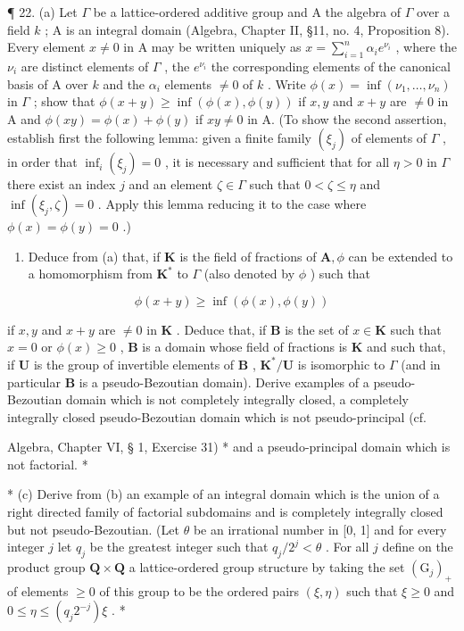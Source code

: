 ¶ 22. (a) Let \(\Gamma\) be a lattice-ordered additive group and A the algebra of \(\Gamma\) over a field \(k\) ; A is an integral domain (Algebra, Chapter II, §11, no. 4, Proposition 8). Every element \(x \neq 0\) in A may be written uniquely as \(x = \sum_{i=1}^{n} \alpha_i e^{\nu_i}\) , where the \(\nu_i\) are distinct elements of \(\Gamma\) , the \(e^{\nu_i}\) the corresponding elements of the canonical basis of A over \(k\) and the \(\alpha_i\) elements \(\neq 0\) of \(k\) . Write \(\phi(x) = \inf(\nu_1, \ldots, \nu_n)\) in \(\Gamma\) ; show that \(\phi(x + y) \geqslant \inf(\phi(x), \phi(y))\) if \(x, y\) and \(x + y\) are \(\neq 0\) in A and \(\phi(xy) = \phi(x) + \phi(y)\) if \(xy \neq 0\) in A. (To show the second assertion, establish first the following lemma: given a finite family \((\xi_j)\) of elements of \(\Gamma\) , in order that \(\inf_{i} (\xi_j) = 0\) , it is necessary and sufficient that for all \(\eta > 0\) in \(\Gamma\) there exist an index \(j\) and an element \(\zeta \in \Gamma\) such that \(0 < \zeta \leqslant \eta\) and \(\inf(\xi_j, \zeta) = 0\) . Apply this lemma reducing it to the case where \(\phi(x) = \phi(y) = 0\) .)

\begin{enumerate}
\def\labelenumi{(\alph{enumi})}
\setcounter{enumi}{1}
\tightlist
\item
  Deduce from (a) that, if \(\mathbf{K}\) is the field of fractions of \(\mathbf{A},\phi\) can be extended to a homomorphism from \(\mathbf{K}^*\) to \(\Gamma\) (also denoted by \(\phi\) ) such that
\end{enumerate}

\[
\phi (x + y) \geqslant \inf (\phi (x), \phi (y))
\]

if \(x, y\) and \(x + y\) are \(\neq 0\) in \(\mathbf{K}\) . Deduce that, if \(\mathbf{B}\) is the set of \(x \in \mathbf{K}\) such that \(x = 0\) or \(\phi(x) \geqslant 0\) , \(\mathbf{B}\) is a domain whose field of fractions is \(\mathbf{K}\) and such that, if \(\mathbf{U}\) is the group of invertible elements of \(\mathbf{B}\) , \(\mathbf{K}^*/\mathbf{U}\) is isomorphic to \(\Gamma\) (and in particular \(\mathbf{B}\) is a pseudo-Bezoutian domain). Derive examples of a pseudo-Bezoutian domain which is not completely integrally closed, a completely integrally closed pseudo-Bezoutian domain which is not pseudo-principal (cf.

Algebra, Chapter VI, § 1, Exercise 31) * and a pseudo-principal domain which is not factorial. *

* (c) Derive from (b) an example of an integral domain which is the union of a right directed family of factorial subdomains and is completely integrally closed but not pseudo-Bezoutian. (Let \(\theta\) be an irrational number in {[}0, 1{]} and for every integer \(j\) let \(q_j\) be the greatest integer such that \(q_j / 2^j < \theta\) . For all \(j\) define on the product group \(\mathbf{Q} \times \mathbf{Q}\) a lattice-ordered group structure by taking the set \((\mathrm{G}_j)_+\) of elements \(\geqslant 0\) of this group to be the ordered pairs \((\xi, \eta)\) such that \(\xi \geqslant 0\) and \(0 \leqslant \eta \leqslant (q_j 2^{-j}) \xi\) . *

